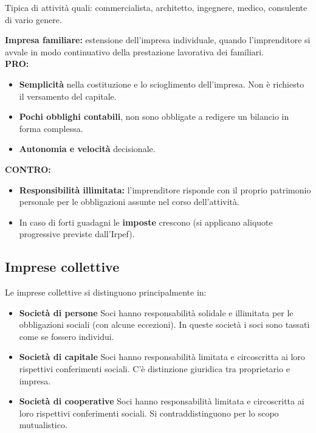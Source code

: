 \documentclass[../main.tex]{subfiles}
\begin{document}
Tipica di attività quali: commercialista, architetto, ingegnere, medico, consulente di vario genere.

\textbf{Impresa familiare:} estensione dell'impresa individuale, quando l'imprenditore si avvale in modo continuativo della prestazione lavorativa dei familiari. \\

\textbf{PRO:}
\begin{itemize}
	\item \textbf{Semplicità} nella costituzione e lo scioglimento dell'impresa. Non è richiesto il versamento del capitale.

	\item \textbf{Pochi obblighi contabili}, non sono obbligate a redigere un bilancio in forma complessa.

	\item \textbf{Autonomia e velocità} decisionale.
\end{itemize}

\textbf{CONTRO:}
\begin{itemize}
	\item \textbf{Responsibilità illimitata:} l'imprenditore risponde con il proprio patrimonio personale per le obbligazioni assunte nel corso dell'attività.

	\item In caso di forti guadagni le \textbf{imposte} crescono (si applicano aliquote progressive previste dall'Irpef).

\end{itemize}

\subsection{Imprese collettive}

Le imprese collettive si distinguono principalmente in:

\begin{itemize}
	\item \textbf{Società di persone}
	      Soci hanno responsabilità solidale e illimitata per le obbligazioni sociali (con alcune eccezioni). In queste società i soci sono tassati come se fossero individui.

	\item \textbf{Società di capitale}
	      Soci hanno responsabilità limitata e circoscritta ai loro rispettivi conferimenti sociali.
	      C'è distinzione giuridica tra proprietario e impresa.

	\item \textbf{Società di cooperative} Soci hanno responsabilità limitata e circoscritta ai loro rispettivi conferimenti sociali.
	      Si contraddistinguono per lo scopo mutualistico.
\end{itemize}
\end{document}
